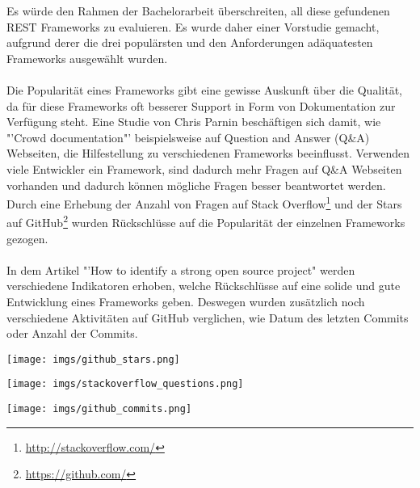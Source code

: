 \documentclass[a4paper,11pt,german,public]{INSOexpose}
\begin{document}
Es würde den Rahmen der Bachelorarbeit überschreiten, all diese gefundenen REST Frameworks zu evaluieren. Es wurde daher einer Vorstudie gemacht, aufgrund derer die drei populärsten und den Anforderungen adäquatesten Frameworks ausgewählt wurden.
\\\\
Die Popularität eines Frameworks gibt eine gewisse Auskunft über die Qualität, da für diese Frameworks oft besserer Support in Form von Dokumentation zur Verfügung steht. Eine Studie von Chris Parnin\cite{parnin2012crowd} beschäftigen sich damit, wie "'Crowd documentation"' beispielsweise auf Question and Answer (Q\&A) Webseiten, die Hilfestellung zu verschiedenen Frameworks beeinflusst. Verwenden viele Entwickler ein Framework, sind dadurch mehr Fragen auf Q\&A Webseiten vorhanden und dadurch können mögliche Fragen besser beantwortet werden. Durch eine Erhebung der Anzahl von Fragen auf Stack Overflow\footnote{\href{http://stackoverflow.com/}{http://stackoverflow.com/}} und der Stars auf GitHub\footnote{\href{https://github.com/}{https://github.com/}} wurden Rückschlüsse auf die Popularität der einzelnen Frameworks gezogen.  
\\\\
In dem Artikel "'How to identify a strong open source project"\cite{balter:strongOS} werden verschiedene Indikatoren erhoben, welche Rückschlüsse auf eine solide und gute Entwicklung eines Frameworks geben. Deswegen wurden zusätzlich noch verschiedene Aktivitäten auf GitHub verglichen, wie Datum des letzten Commits oder Anzahl der Commits.

\begin{minipage}{\textwidth} 
	\centering	
	\texttt{[image: imgs/github\_stars.png]}
	\label{figure:githubStars}
	\vspace{2ex}
\end{minipage}

\begin{minipage}{\textwidth} 
	\centering	
	\texttt{[image: imgs/stackoverflow\_questions.png]}
	\label{figure:stackoverflowQuestions}
	\vspace{2ex}
\end{minipage}

\begin{minipage}{\textwidth} 
	\centering	
	\texttt{[image: imgs/github\_commits.png]}
	\label{figure:githubCommits}
	\vspace{2ex}
\end{minipage}
\end{document}

